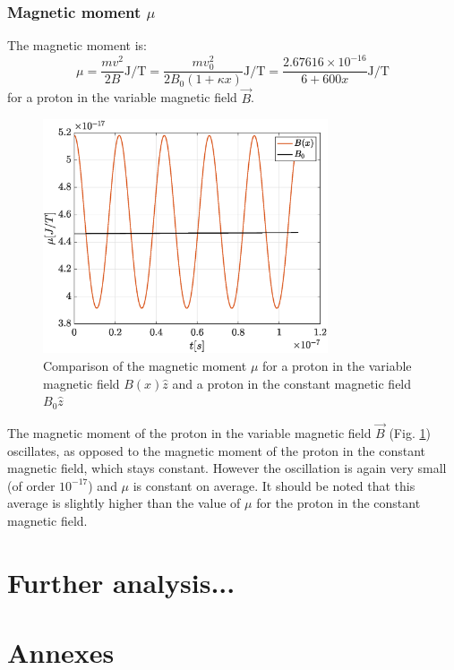 \documentclass[a4paper,12pt,twoside]{article}
\begin{document}
\subsubsection{Magnetic moment $\mu$} %

The magnetic moment is:
\begin{equation}
\mu = \frac{mv^2}{2B} \si{\joule \per \tesla} = \frac{mv_0^2}{2B_0(1+\kappa x)} \si{\joule \per \tesla} = \frac{2.67616 \times 10^{-16}}{6+600x} \si{\joule \per \tesla}
\end{equation}
for a proton in the variable magnetic field $\vec{B}$.

\begin{figure}[h]
\centering
	\includegraphics[width=0.75\textwidth]{graphs/mu.eps}
	\caption{Comparison of the magnetic moment $\mu$ for a proton in the variable magnetic field $B(x)\hat{z}$ and a proton in the constant magnetic field $B_0\hat{z}$}
	\label{fig:mu}
\end{figure}

The magnetic moment of the proton in the variable magnetic field $\vec{B}$ (Fig. \ref{fig:mu}) oscillates, as opposed to the magnetic moment of the proton in the constant magnetic field, which stays constant. However the oscillation is again very small (of order $10^{-17}$) and $\mu$ is constant on average. It should be noted that this average is slightly higher than the value of $\mu$ for the proton in the constant magnetic field.

\section{Further analysis...}

\appendix
\section*{Annexes}
\end{document}
